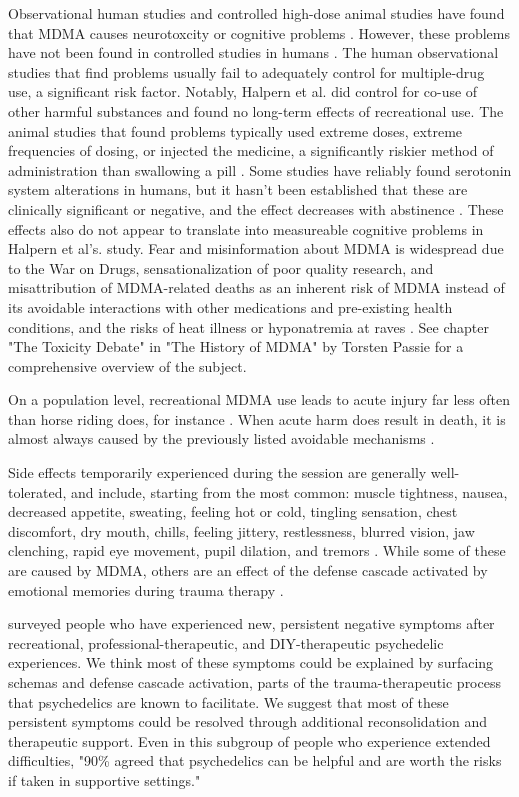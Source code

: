 \documentclass[12pt,letterpaper]{article}
\begin{document}
Observational human studies and controlled high-dose animal studies have found that MDMA causes neurotoxcity or cognitive problems \cite{passieHistory}. However, these problems have not been found in controlled studies in humans \cite{halpernMormonRavers,mitchellMDMAClinicalTrial}. The human observational studies that find problems usually fail to adequately control for multiple-drug use, a significant risk factor. Notably, Halpern et al. did control for co-use of other harmful substances and found no long-term effects of recreational use. The animal studies that found problems typically used extreme doses, extreme frequencies of dosing, or injected the medicine, a significantly riskier method of administration than swallowing a pill \cite{passieHistory}. Some studies have reliably found serotonin system alterations in humans, but it hasn't been established that these are clinically significant or negative, and the effect decreases with abstinence \cite{gouzoulis2006neurotoxicity}. These effects also do not appear to translate into measureable cognitive problems in Halpern et al's. study. Fear and misinformation about MDMA is widespread due to the War on Drugs, sensationalization of poor quality research, and misattribution of MDMA-related deaths as an inherent risk of MDMA instead of its avoidable interactions with other medications and pre-existing health conditions, and the risks of heat illness or hyponatremia at raves \cite{passieHistory}. See chapter "The Toxicity Debate" in "The History of MDMA" by Torsten Passie for a comprehensive overview of the subject.

On a population level, recreational MDMA use leads to acute injury far less often than horse riding does, for instance \cite{nutt2009equasy}. When acute harm does result in death, it is almost always caused by the previously listed avoidable mechanisms \cite{riggDeaths}.

Side effects temporarily experienced during the session are generally well-tolerated, and include, starting from the most common: muscle tightness, nausea, decreased appetite, sweating, feeling hot or cold, tingling sensation, chest discomfort, dry mouth, chills, feeling jittery, restlessness, blurred vision, jaw clenching, rapid eye movement, pupil dilation, and tremors \cite{mitchellMDMAClinicalTrial2}. While some of these are caused by MDMA, others are an effect of the defense cascade activated by emotional memories during trauma therapy \cite{kozlowskaDefenseCascade}.

\textcite{evans2023extended} surveyed people who have experienced new, persistent negative symptoms after recreational, professional-therapeutic, and DIY-therapeutic psychedelic experiences. We think most of these symptoms could be explained by surfacing schemas and defense cascade activation, parts of the trauma-therapeutic process that psychedelics are known to facilitate. We suggest that most of these persistent symptoms could be resolved through additional reconsolidation and therapeutic support. Even in this subgroup of people who experience extended difficulties, "90\% agreed that psychedelics can be helpful and are worth the risks if taken in supportive settings."
\end{document}
